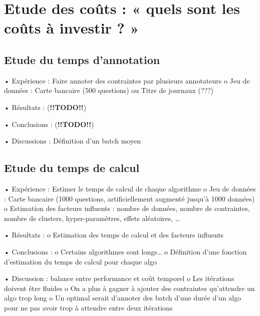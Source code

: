     \section{Etude des coûts : « quels sont les coûts à investir ? »}

        \subsection{Etude du temps d’annotation}

        •	Expérience : Faire annoter des contraintes par plusieurs annotateurs
            o	Jeu de données : Carte bancaire (500 questions) ou Titre de journaux (???)

        •	Résultats : (\textbf{!!TODO!!})
        
        •	Conclusions : (\textbf{!!TODO!!})

        •	Discussions : Définition d’un batch moyen


        \subsection{Etude du temps de calcul}

        •	Expérience : Estimer le temps de calcul de chaque algorithme
            o	Jeu de données : Carte bancaire (1000 questions, artificiellement augmenté jusqu’à 1000 données)
            o	Estimation des facteurs influents : nombre de données, nombre de contraintes, nombre de clusters, hyper-paramètres, effets aléatoires, …

        •	Résultats :
            o	Estimation des temps de calcul et des facteurs influents

        •	Conclusions :
            o	Certains algorithmes sont longs…
            o	Définition d’une fonction d’estimation du temps de calcul pour chaque algo

        •	Discussion : balance entre performance et coût temporel
            o	Les itérations doivent être fluides
            o	On a plus à gagner à ajouter des contraintes qu’attendre un algo trop long
            o	Un optimal serait d’annoter des batch d’une durée d’un algo pour ne pas avoir trop à attendre entre deux itérations

